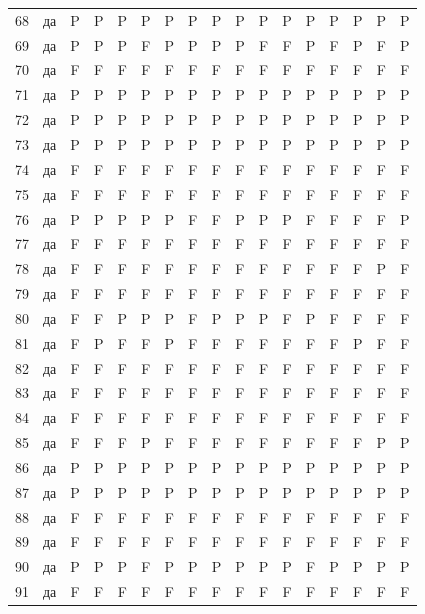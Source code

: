 \begin{table}[p]
\begin{tabular*}{\textwidth}{@{\extracolsep{\fill}}rcccccccccccccccc}
68 & да & P & P & P & P & P & P & P & P & P & P & P & P & P & P & P\\
69 & да & P & P & P & F & P & P & P & P & F & F & P & F & P & F & P\\
70 & да & F & F & F & F & F & F & F & F & F & F & F & F & F & F & F\\
71 & да & P & P & P & P & P & P & P & P & P & P & P & P & P & P & P\\
72 & да & P & P & P & P & P & P & P & P & P & P & P & P & P & P & P\\
73 & да & P & P & P & P & P & P & P & P & P & P & P & P & P & P & P\\
74 & да & F & F & F & F & F & F & F & F & F & F & F & F & F & F & F\\
75 & да & F & F & F & F & F & F & F & F & F & F & F & F & F & F & F\\
76 & да & P & P & P & P & P & F & F & P & P & P & F & F & F & F & P\\
77 & да & F & F & F & F & F & F & F & F & F & F & F & F & F & F & F\\
78 & да & F & F & F & F & F & F & F & F & F & F & F & F & F & P & F\\
79 & да & F & F & F & F & F & F & F & F & F & F & F & F & F & F & F\\
80 & да & F & F & P & P & P & F & P & P & P & F & P & F & F & F & F\\
81 & да & F & P & F & F & P & F & F & F & F & F & F & F & P & F & F\\
82 & да & F & F & F & F & F & F & F & F & F & F & F & F & F & F & F\\
83 & да & F & F & F & F & F & F & F & F & F & F & F & F & F & F & F\\
84 & да & F & F & F & F & F & F & F & F & F & F & F & F & F & F & F\\
85 & да & F & F & F & P & F & F & F & F & F & F & F & F & F & P & P\\
86 & да & P & P & P & P & P & P & P & P & P & P & P & P & P & P & P\\
87 & да & P & P & P & P & P & P & P & P & P & P & P & P & P & P & P\\
88 & да & F & F & F & F & F & F & F & F & F & F & F & F & F & F & F\\
89 & да & F & F & F & F & F & F & F & F & F & F & F & F & F & F & F\\
90 & да & P & P & P & F & P & P & P & P & P & P & F & P & P & P & P\\
91 & да & F & F & F & F & F & F & F & F & F & F & F & F & F & F & F\\
\bottomrule\end{tabular*}\end{table}
\clearpage

